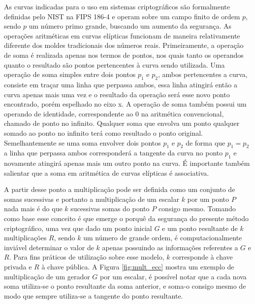 %
As curvas indicadas para o uso em sistemas criptográficos são formalmente definidas pelo NIST na FIPS 186-4 e operam sobre um campo finito de ordem $p$, sendo $p$ um número primo grande, buscando um aumento da segurança. As operações aritméticas em curvas elípticas funcionam de maneira relativamente diferente dos moldes tradicionais dos números reais. Primeiramente, a operação de soma é realizada apenas nos termos de pontos, nos quais tanto os operandos quanto o resultado são pontos pertencentes à curva sendo utilizada. Uma operação de soma simples entre dois pontos $p_1$ e $p_2$, ambos pertencentes a curva, consiste em traçar uma linha que perpassa ambos, essa linha atingirá então a curva apenas mais uma vez e o resultado da operação será esse novo ponto encontrado, porém espelhado no eixo x. A operação de soma também possui um operando de identidade, correspondente ao 0 na aritmética convencional, chamado de ponto no infinito. Qualquer soma que envolva um ponto qualquer somado ao ponto no infinito terá como resultado o ponto original. Semelhantemente se uma soma envolver dois pontos $p_1$ e $p_2$ de forma que $p_1 = p_2$ a linha que perpassa ambos corresponderá a tangente da curva no ponto $p_1$ e novamente atingirá apenas mais um outro ponto na curva. É importante também salientar que a soma em aritmética de curvas elípticas é associativa.

%
A partir desse ponto a multiplicação pode ser definida como um conjunto de somas sucessivas e portanto a multiplicação de um escalar $k$ por um ponto $P$ nada mais é do que $k$ sucessivas somas do ponto $P$ consigo mesmo. Tomando como base esse conceito é que emerge o porquê da segurança do presente método criptográfico, uma vez que dado um ponto inicial $G$ e um ponto resultante de $k$ multiplicações $R$, sendo $k$ um número de grande ordem, é computacionalmente inviável determinar o valor de $k$ apenas possuindo as informações referentes a $G$ e $R$. Para fins práticos de utilização sobre esse modelo, $k$ corresponde à chave privada e $R$ à chave pública. A Figura \ref{fig:mult_ecc} mostra um exemplo de multiplicação de um gerador $G$ por um escalar, é possível notar que a cada nova soma utiliza-se o ponto resultante da soma anterior, e soma-o consigo mesmo de modo que sempre utiliza-se a tangente do ponto resultante.

